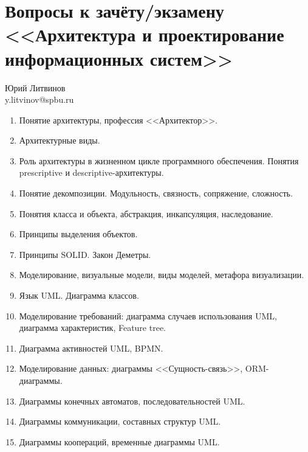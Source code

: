 \documentclass[a5paper]{article}
\begin{document}
\thispagestyle{empty}

\section*{Вопросы к зачёту/экзамену <<Архитектура и проектирование информационных систем>>}

\begin{flushright}\begin{small}Юрий Литвинов\\\small{y.litvinov@spbu.ru}\end{small}\end{flushright}

\begin{enumerate}
    \item Понятие архитектуры, профессия <<Архитектор>>.
    \item Архитектурные виды.
    \item Роль архитектуры в жизненном цикле программного обеспечения. Понятия prescriptive и descriptive-архитектуры.
    \item Понятие декомпозиции. Модульность, связность, сопряжение, сложность.
    \item Понятия класса и объекта, абстракция, инкапсуляция, наследование. 
    \item Принципы выделения объектов.
    \item Принципы SOLID. Закон Деметры.
    \item Моделирование, визуальные модели, виды моделей, метафора визуализации.
    \item Язык UML. Диаграмма классов.
    \item Моделирование требований: диаграмма случаев использования UML, диаграмма характеристик, Feature tree.
    \item Диаграмма активностей UML, BPMN.
    \item Моделирование данных: диаграммы <<Сущность-связь>>, ORM-диаграммы.
    \item Диаграммы конечных автоматов, последовательностей UML.
    \item Диаграммы коммуникации, составных структур UML.
    \item Диаграммы коопераций, временные диаграммы UML.

\end{enumerate}
\end{document}
